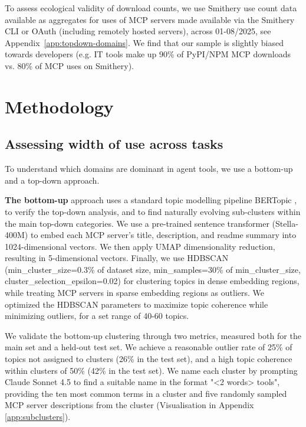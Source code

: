 \documentclass[manuscript,screen,nonacm,oneside]{acmart}
\begin{document}
To assess ecological validity of download counts, we use Smithery use count data available as aggregates for uses of MCP servers made available via the Smithery CLI or OAuth (including remotely hosted servers), across 01-08/2025, see Appendix~\ref{app:topdown-domains}. We find that our sample is slightly biased towards developers (e.g. IT tools make up 90\% of PyPI/NPM MCP downloads vs. 80\% of MCP uses on Smithery).

\section{Methodology}
\label{sec:methodology}

\subsection{Assessing width of use across tasks}
\label{sec:topic-modelling}

To understand which domains are dominant in agent tools, we use a bottom-up and a top-down approach. 

\textbf{The bottom-up} approach uses a standard topic modelling pipeline BERTopic \citep{grootendorst2022bertopic}, to verify the top-down analysis, and to find naturally evolving sub-clusters within the main top-down categories. 
We use a pre-trained sentence transformer (Stella-400M) to embed each MCP server's title, description, and readme summary into 1024-dimensional vectors. We then apply UMAP dimensionality reduction, resulting in 5-dimensional vectors. Finally, we use HDBSCAN (min\_cluster\_size=0.3\% of dataset size, min\_samples=30\% of min\_cluster\_size, cluster\_selection\_epsilon=0.02) for clustering topics in dense embedding regions, while treating MCP servers in sparse embedding regions as outliers. We optimized the HDBSCAN parameters to maximize topic coherence while minimizing outliers, for a set range of 40-60 topics.

We validate the bottom-up clustering through two metrics, measured both for the main set and a held-out test set. We achieve a reasonable outlier rate of 25\% of topics not assigned to clusters (26\% in the test set), and a high topic coherence \citep{roder2015exploring} within clusters of 50\% (42\% in the test set). We name each cluster by prompting Claude Sonnet 4.5 to find a suitable name in the format "\textless2 words\textgreater{} tools", providing the ten most common terms in a cluster and five randomly sampled MCP server descriptions from the cluster (Visualisation in Appendix \ref{app:subclusters}).
\end{document}
